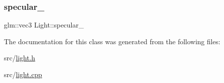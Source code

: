 \mbox{\label{classLight_a9b425b4f0b04ec90da7de4bf77f30d1c}} 
\subsubsection{\texorpdfstring{specular\+\_\+}{specular\_}}
{\footnotesize\ttfamily glm\+::vec3 Light\+::specular\+\_\+}



The documentation for this class was generated from the following files\+:\begin{DoxyCompactItemize}
\item 
src/\hyperlink{light_8h}{light.\+h}\item 
src/\hyperlink{light_8cpp}{light.\+cpp}\end{DoxyCompactItemize}
